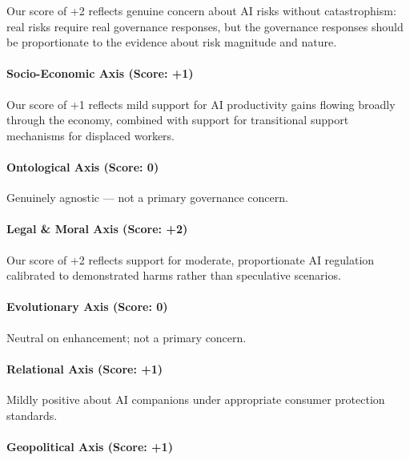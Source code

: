 Our score of +2 reflects genuine concern about AI risks without
catastrophism: real risks require real governance responses, but the
governance responses should be proportionate to the evidence about risk
magnitude and nature.

\paragraph{Socio-Economic Axis (Score:
+1)}\label{socio-economic-axis-score-1}

Our score of +1 reflects mild support for AI productivity gains flowing
broadly through the economy, combined with support for transitional
support mechanisms for displaced workers.

\paragraph{Ontological Axis (Score:
0)}\label{ontological-axis-score-0-13}

Genuinely agnostic --- not a primary governance concern.

\paragraph{Legal \& Moral Axis (Score:
+2)}\label{legal-moral-axis-score-2-1}

Our score of +2 reflects support for moderate, proportionate AI
regulation calibrated to demonstrated harms rather than speculative
scenarios.

\paragraph{Evolutionary Axis (Score:
0)}\label{evolutionary-axis-score-0-5}

Neutral on enhancement; not a primary concern.

\paragraph{Relational Axis (Score: +1)}\label{relational-axis-score-1}

Mildly positive about AI companions under appropriate consumer
protection standards.

\paragraph{Geopolitical Axis (Score:
+1)}\label{geopolitical-axis-score-1-2}

